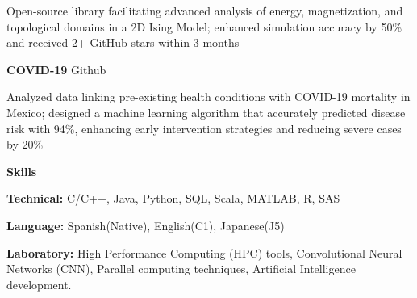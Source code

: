 \documentclass[6pt]{article}
\begin{document}
Open-source library facilitating advanced analysis of energy, magnetization, and topological domains in a 2D Ising Model; enhanced simulation accuracy by 50\% and received 2+ GitHub stars within 3 months

\vspace{12pt}

\textbf{COVID-19} \hfill Github

Analyzed data linking pre-existing health conditions with COVID-19 mortality in Mexico; designed a machine learning algorithm that accurately predicted disease risk with 94\%, enhancing early intervention strategies and reducing severe cases by 20\%

\vspace{12pt}
\begin{center}
    \textbf{Skills}
\end{center}

\textbf{Technical:} C/C++, Java, Python, SQL, Scala, MATLAB, R, SAS

\textbf{Language:} Spanish(Native), English(C1), Japanese(J5)

\textbf{Laboratory:} High Performance Computing (HPC) tools, Convolutional Neural Networks (CNN), Parallel computing techniques, Artificial Intelligence development.
\end{document}
